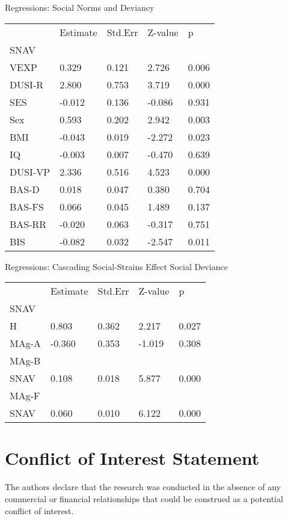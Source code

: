 \documentclass[utf8]{frontiersSCNS} %
\begin{document}
Regressions: Social Norms and Deviancy
\begin{table}[]
\begin{tabular}{lllll}
        & Estimate & Std.Err & Z-value & p     \\
SNAV    &          &         &         &       \\
VEXP    & 0.329    & 0.121   & 2.726   & 0.006 \\
DUSI-R  & 2.800    & 0.753   & 3.719   & 0.000 \\
SES     & -0.012   & 0.136   & -0.086  & 0.931 \\
Sex     & 0.593    & 0.202   & 2.942   & 0.003 \\
BMI     & -0.043   & 0.019   & -2.272  & 0.023 \\
IQ      & -0.003   & 0.007   & -0.470  & 0.639 \\
DUSI-VP & 2.336    & 0.516   & 4.523   & 0.000 \\
BAS-D   & 0.018    & 0.047   & 0.380   & 0.704 \\
BAS-FS  & 0.066    & 0.045   & 1.489   & 0.137 \\
BAS-RR  & -0.020   & 0.063   & -0.317  & 0.751 \\
BIS     & -0.082   & 0.032   & -2.547  & 0.011
\end{tabular}
\end{table}

Regressions: Cascading Social-Strains Effect Social Deviance
\begin{table}[]
\begin{tabular}{lllll}
      & Estimate & Std.Err & Z-value & p     \\
SNAV  &          &         &         &       \\
H     & 0.803    & 0.362   & 2.217   & 0.027 \\
MAg-A & -0.360   & 0.353   & -1.019  & 0.308 \\
MAg-B &          &         &         &       \\
SNAV  & 0.108    & 0.018   & 5.877   & 0.000 \\
MAg-F &          &         &         &       \\
SNAV  & 0.060    & 0.010   & 6.122   & 0.000
\end{tabular}
\end{table}




\section*{Conflict of Interest Statement}
The authors declare that the research was conducted in the absence of any commercial or financial relationships that could be construed as a potential conflict of interest.
\end{document}
